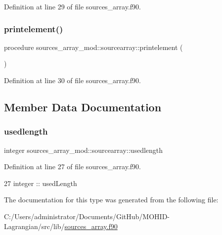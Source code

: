Definition at line 29 of file sources\+\_\+array.\+f90.

\mbox{\label{structsources__array__mod_1_1sourcearray_a72a537b29e5b5cf3ba35745cb7b41524}} 
\subsubsection{\texorpdfstring{printelement()}{printelement()}}
{\footnotesize\ttfamily procedure sources\+\_\+array\+\_\+mod\+::sourcearray\+::printelement (\begin{DoxyParamCaption}{ }\end{DoxyParamCaption})\hspace{0.3cm}{\ttfamily [private]}}



Definition at line 30 of file sources\+\_\+array.\+f90.



\subsection{Member Data Documentation}
\mbox{\label{structsources__array__mod_1_1sourcearray_ad23c5d5462e36271240c333a9415190b}} 
\subsubsection{\texorpdfstring{usedlength}{usedlength}}
{\footnotesize\ttfamily integer sources\+\_\+array\+\_\+mod\+::sourcearray\+::usedlength\hspace{0.3cm}{\ttfamily [private]}}



Definition at line 27 of file sources\+\_\+array.\+f90.


\begin{DoxyCode}
27         \textcolor{keywordtype}{integer} :: usedLength
\end{DoxyCode}


The documentation for this type was generated from the following file\+:\begin{DoxyCompactItemize}
\item 
C\+:/\+Users/administrator/\+Documents/\+Git\+Hub/\+M\+O\+H\+I\+D-\/\+Lagrangian/src/lib/\mbox{\hyperlink{sources__array_8f90}{sources\+\_\+array.\+f90}}\end{DoxyCompactItemize}
